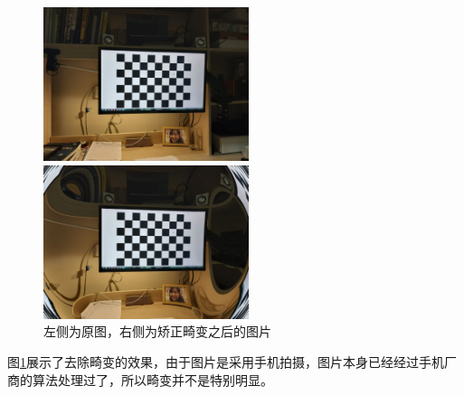 \documentclass[]{article}
\begin{document}
\begin{figure}[htbp]
        \begin{minipage}[t]{0.4\textwidth}
            \centering
            \includegraphics[width=6cm]{../code/test/1.jpg}
        \end{minipage}
        \begin{minipage}[t]{0.4\textwidth}
            \centering
            \includegraphics[width=6cm]{../code/test/1_jpg_undistorted.jpg}
        \end{minipage}

        \caption{左侧为原图，右侧为矫正畸变之后的图片}
        \label{fig2}
    \end{figure}

    图\ref{fig2}展示了去除畸变的效果，由于图片是采用手机拍摄，图片本身已经经过手机厂商的算法处理过了，所以畸变并不是特别明显。
\end{document}
